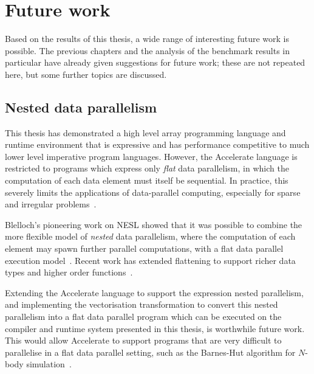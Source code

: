 %
%


\section{Future work}

Based on the results of this thesis, a wide range of interesting future work is
possible. The previous chapters and the analysis of the benchmark results in
particular have already given suggestions for future work; these are not
repeated here, but some further topics are discussed.

\subsection{Nested data parallelism}

This thesis has demonstrated a high level array programming language and runtime
environment that is expressive and has performance competitive to much lower
level imperative program languages. However, the Accelerate language is
restricted to programs which express only \emph{flat} data parallelism, in which
the computation of each data element must itself be sequential. In practice,
this severely limits the applications of data-parallel computing, especially for
sparse and irregular problems~\cite{Prins:1999}.

Blelloch's pioneering work on NESL showed that it was possible to combine the
more flexible model of \emph{nested} data parallelism, where the computation of
each element may spawn further parallel computations, with a flat data parallel
execution model~\cite{Blelloch:1988iu}. Recent work has extended flattening to
support richer data types and higher order functions~\cite{Jones:2008uu}.

Extending the Accelerate language to support the expression nested parallelism,
and implementing the vectorisation transformation to convert this nested
parallelism into a flat data parallel program which can be executed on the
compiler and runtime system presented in this thesis, is worthwhile future work.
This would allow Accelerate to support programs that are very difficult to
parallelise in a flat data parallel setting, such as the Barnes-Hut algorithm
for $N$-body simulation~\cite{Barnes:1986}.


